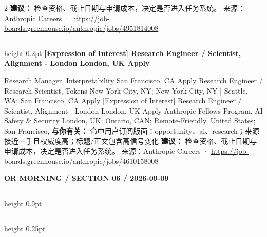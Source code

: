 \documentclass[10.5pt]{ctexart}
\begin{document}
\begin{multicols}{2}
\textbf{建议：} 检查资格、截止日期与申请成本，决定是否进入任务系统。
{\footnotesize\color{ormuted} 来源：Anthropic Careers · \url{https://job-boards.greenhouse.io/anthropic/jobs/4951814008}}
\vspace{2mm}
\hrule height 0.2pt
\vspace{2mm}
{\large\bfseries [Expression of Interest] Research Engineer / Scientist, Alignment - London London, UK Apply}\par
[Expression of Interest] Research Manager, Interpretability San Francisco, CA Apply Research Engineer / Research Scientist, Tokens New York City, NY; New York City, NY | Seattle, WA; San Francisco, CA Apply [Expression of Interest] Research Engineer / Scientist, Alignment - London London, UK Apply Anthropic Fellows Program, AI Safety \& Security London, UK; Ontario, CAN; Remote-Friendly, United States; San Francisco, 
\textbf{与你有关：} 命中用户订阅版面：opportunity、ai、research；来源接近一手且权威度高；标题/正文包含高信号变化
\textbf{建议：} 检查资格、截止日期与申请成本，决定是否进入任务系统。
{\footnotesize\color{ormuted} 来源：Anthropic Careers · \url{https://job-boards.greenhouse.io/anthropic/jobs/4610158008}}
\end{multicols}
\newpage
{\small\bfseries OR MORNING / SECTION 06 / 2026-09-09}
\vspace{2mm}
\hrule height 0.9pt
\vspace{1.5mm}
\hrule height 0.25pt
\vspace{4mm}
\end{document}
